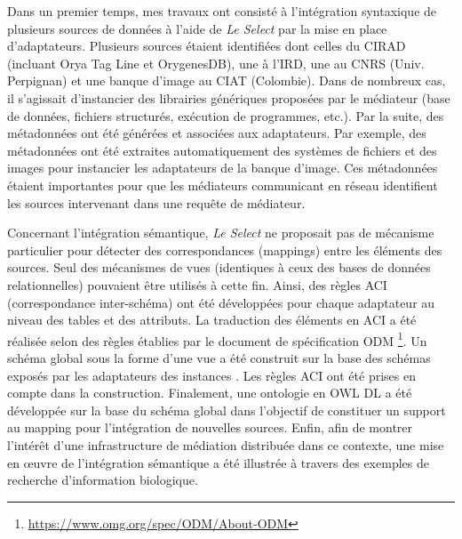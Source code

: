 Dans un premier temps, mes travaux ont consisté à l'intégration syntaxique de plusieurs sources de données à l'aide de \textit{Le Select} par la mise en place d'adaptateurs. Plusieurs sources étaient identifiées dont celles du CIRAD (incluant Orya Tag Line et OrygenesDB), une à l'IRD, une au CNRS (Univ. Perpignan) et une banque d'image au CIAT (Colombie). Dans de nombreux cas, il s'agissait d'instancier des librairies génériques proposées par le médiateur (base de données, fichiers structurés, exécution de programmes, etc.). Par la suite, des métadonnées ont été générées et associées aux adaptateurs. Par exemple, des métadonnées ont été extraites automatiquement des systèmes de fichiers et des images pour instancier les adaptateurs de la banque d'image. Ces métadonnées étaient importantes pour que les médiateurs communicant en réseau identifient les sources intervenant dans une requête de médiateur.

Concernant l'intégration sémantique, \textit{Le Select} ne proposait pas de mécanisme particulier pour détecter des correspondances (mappings) entre les éléments des sources. Seul des mécanismes de vues (identiques à ceux des bases de données relationnelles) pouvaient être utilisés à cette fin.  Ainsi, des règles ACI (correspondance inter-schéma) ont été développées pour chaque adaptateur au niveau des tables et des attributs. La traduction des éléments en ACI a été réalisée selon des règles établies par le document de spécification ODM  \footnote{\url{https://www.omg.org/spec/ODM/About-ODM}}. Un schéma global sous la forme d'une vue a été construit sur la base des schémas exposés par les adaptateurs des instances . Les règles ACI ont été prises en compte dans la construction. Finalement,  une ontologie en OWL DL a été développée sur la base du schéma global dans l'objectif de constituer un support au mapping pour l'intégration de nouvelles sources.  Enfin, afin de montrer l'intérêt d'une infrastructure de médiation distribuée dans ce contexte, une mise en \oe uvre de l'intégration sémantique a été illustrée à travers des exemples de recherche d'information biologique. \\

